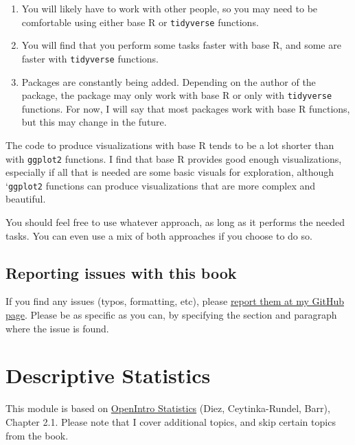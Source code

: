 \documentclass[
]{book}
\providecommand{\tightlist}{%
  \setlength{\itemsep}{0pt}\setlength{\parskip}{0pt}}
\begin{document}
\begin{enumerate}
\def\labelenumi{\arabic{enumi}.}
\tightlist
\item
  You will likely have to work with other people, so you may need to be comfortable using either base R or \texttt{tidyverse} functions.
\item
  You will find that you perform some tasks faster with base R, and some are faster with \texttt{tidyverse} functions.
\item
  Packages are constantly being added. Depending on the author of the package, the package may only work with base R or only with \texttt{tidyverse} functions. For now, I will say that most packages work with base R functions, but this may change in the future.
\end{enumerate}

The code to produce visualizations with base R tends to be a lot shorter than with \texttt{ggplot2} functions. I find that base R provides good enough visualizations, especially if all that is needed are some basic visuals for exploration, although `\texttt{ggplot2} functions can produce visualizations that are more complex and beautiful.

You should feel free to use whatever approach, as long as it performs the needed tasks. You can even use a mix of both approaches if you choose to do so.

\hypertarget{reporting-issues-with-this-book}{%
\section*{Reporting issues with this book}\label{reporting-issues-with-this-book}}

If you find any issues (typos, formatting, etc), please \href{https://github.com/jwooSDS/uncertainty/issues}{report them at my GitHub page}. Please be as specific as you can, by specifying the section and paragraph where the issue is found.

\hypertarget{descriptive}{%
\chapter{Descriptive Statistics}\label{descriptive}}

This module is based on \href{https://www.openintro.org/book/os/}{OpenIntro Statistics} (Diez, Ceytinka-Rundel, Barr), Chapter 2.1. Please note that I cover additional topics, and skip certain topics from the book.
\end{document}
